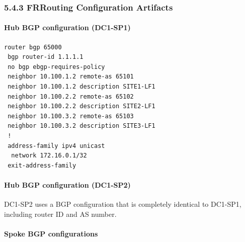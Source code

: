\documentclass[11pt]{article}
\begin{document}
%
%
%
\subsubsection{5.4.3 FRRouting Configuration Artifacts}
\label{sec:bgp-config-artifacts}

\paragraph{Hub BGP configuration (DC1-SP1)}

\begin{verbatim}
router bgp 65000
 bgp router-id 1.1.1.1
 no bgp ebgp-requires-policy
 neighbor 10.100.1.2 remote-as 65101
 neighbor 10.100.1.2 description SITE1-LF1
 neighbor 10.100.2.2 remote-as 65102
 neighbor 10.100.2.2 description SITE2-LF1
 neighbor 10.100.3.2 remote-as 65103
 neighbor 10.100.3.2 description SITE3-LF1
 !
 address-family ipv4 unicast
  network 172.16.0.1/32
 exit-address-family
\end{verbatim}

%
\paragraph{Hub BGP configuration (DC1-SP2)}

DC1-SP2 uses a BGP configuration that is completely identical to DC1-SP1, including router ID and AS number.

\paragraph{Spoke BGP configurations}
\end{document}

